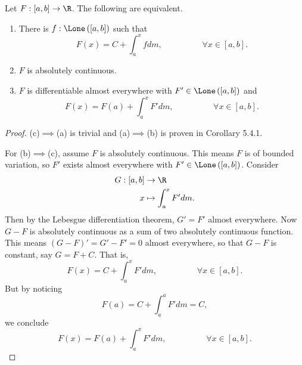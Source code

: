 \documentclass[pmath451]{subfiles}
\begin{document}
    \begin{theorem}{}
        Let $F:\left[ a,b \right]\to\R$. The following are equivalent.
        \begin{enumerate}
            \item There is $f:\Lone\left( \left[ a,b \right] \right)$ such that
                \begin{equation*}
                    F\left( x \right) = C+\int^{x}_{a} fdm, \hspace{2cm}\forall x\in\left[ a,b \right].
                \end{equation*}
            \item $F$ is absolutely continuous.
            \item $F$ is differentiable almost everywhere with $F'\in\Lone\left( \left[ a,b \right] \right)$ and
                \begin{equation*}
                    F\left( x \right) = F\left( a \right) + \int^{x}_{a}F'dm, \hspace{2cm}\forall x\in\left[ a,b \right].
                \end{equation*}
        \end{enumerate}
    \end{theorem}

    \begin{proof}
        (c)$\implies$(a) is trivial and (a)$\implies$(b) is proven in Corollary 5.4.1.

        For (b)$\implies$(c), assume $F$ is absolutely continuous. This means $F$ is of bounded variation, so $F'$ exists almost everywhere with $F'\in\Lone\left( \left[ a,b \right] \right)$. Consider
        \begin{equation*}
            \begin{aligned}
                G:\left[ a,b \right]&\to\R \\
                x&\mapsto \int^{x}_{a}F'dm.
            \end{aligned} 
        \end{equation*}
        Then by the Lebesgue differentiation theorem, $G'=F'$ almost everywhere. Now $G-F$ is absolutely continuous as a sum of two absolutely continuous function. This means $\left( G-F \right)' = G'-F' = 0$ almost everywhere, so that $G-F$ is constant, say $G=F+C$. That is,
        \begin{equation*}
            F\left( x \right) = C+\int^{x}_{a} F'dm , \hspace{2cm}\forall x\in\left[ a,b \right].
        \end{equation*}
        But by noticing
        \begin{equation*}
            F\left( a \right) = C + \int^{a}_{a}F'dm = C,
        \end{equation*}
        we conclude
        \begin{equation*}
            F\left( x \right) = F\left( a \right) + \int^{x}_{a}F'dm, \hspace{2cm}\forall x\in\left[ a,b \right].
        \end{equation*}
    \end{proof}
    
\end{document}
